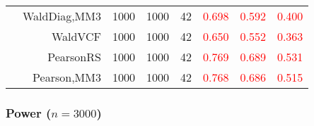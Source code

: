 \documentclass[
]{article}
\begin{document}
\begin{table}[H]
{\begin{tabular}[t]{lrrrrrrr}
\hspace{1em} & WaldDiag,MM3 & 1000 & 1000 & 42 & \textcolor{red}{0.698} & \textcolor{red}{0.592} & \textcolor{red}{0.400}\\

\hspace{1em} & WaldVCF & 1000 & 1000 & 42 & \textcolor{red}{0.650} & \textcolor{red}{0.552} & \textcolor{red}{0.363}\\

\hspace{1em} & PearsonRS & 1000 & 1000 & 42 & \textcolor{red}{0.769} & \textcolor{red}{0.689} & \textcolor{red}{0.531}\\

\hspace{1em} & Pearson,MM3 & 1000 & 1000 & 42 & \textcolor{red}{0.768} & \textcolor{red}{0.686} & \textcolor{red}{0.515}\\
\bottomrule
\end{tabular}}
\endgroup{}
\end{table}

\hypertarget{power-n3000}{%
\subsubsection{\texorpdfstring{Power
(\(n=3000\))}{Power (n=3000)}}\label{power-n3000}}
\end{document}
